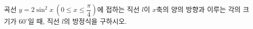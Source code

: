 곡선 $y=2\sin^2 x\ \left(0\le x\le\dfrac{\pi}{4}\right)$에 접하는 직선 $l$이 $x$축의 양의 방향과 이루는 각의 크기가 $60^\circ$일 때, 직선 $l$의 방정식을 구하시오.
